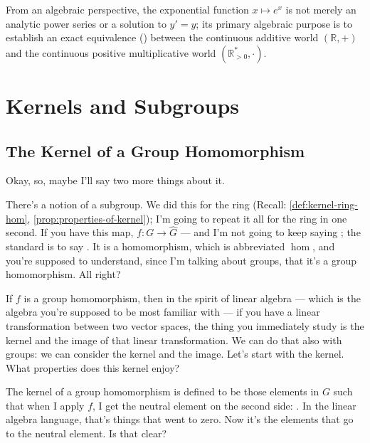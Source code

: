 \begin{insight}
From an algebraic perspective, the exponential function $x \mapsto e^x$ is not merely an analytic power series or a solution to $y' = y$; its primary algebraic purpose is to establish an exact equivalence () between the continuous additive world $(\mathbb{R}, +)$ and the continuous positive multiplicative world $(\mathbb{R}^*_{>0}, \cdot)$.
\end{insight}

\begin{hidden}
\end{hidden}

\section{Kernels and Subgroups}

\subsection{The Kernel of a Group Homomorphism}

\begin{speech}[00:19:27 - 00:20:55]
Okay, so, maybe I'll say two more things about it.

There's a notion of a subgroup. We did this for the ring (Recall: \cref{def:kernel-ring-hom}, \cref{prop:properties-of-kernel}); I'm going to repeat it all for the ring in one second. If you have this map, $f \colon G \to \hat{G}$ --- and I'm not going to keep saying ; the standard is to say . It is a homomorphism, which is abbreviated $\operatorname{hom}$,  and you're supposed to understand, since I'm talking about groups, that it's a group homomorphism. All right?

If $f$ is a group homomorphism, then in the spirit of linear algebra --- which is the algebra you're supposed to be most familiar with --- if you have a linear transformation between two vector spaces, the thing you immediately study is the kernel and the image of that linear transformation. We can do that also with groups: we can consider the kernel and the image.  Let's start with the kernel. What properties does this kernel enjoy?

The kernel of a group homomorphism is defined to be those elements in $G$ such that when I apply $f$, I get the neutral element on the second side: . In the linear algebra language, that's things that went to zero. Now it's the elements that go to the neutral element. Is that clear?
\end{speech}

